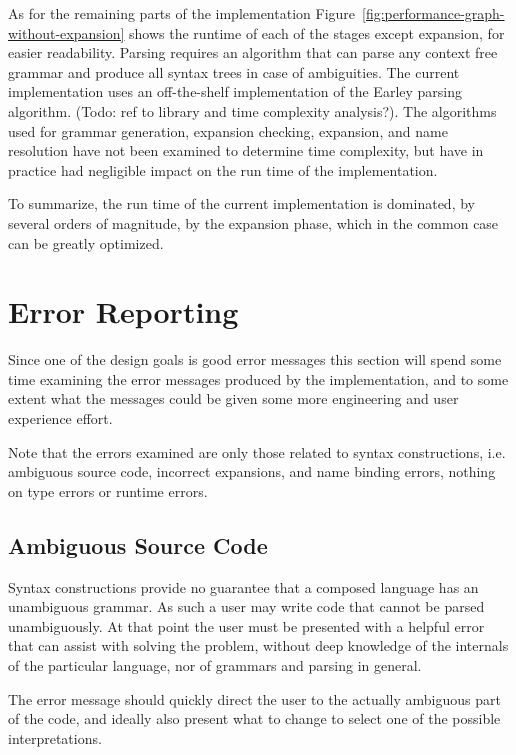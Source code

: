\documentclass{kththesis}
\begin{document}
As for the remaining parts of the implementation Figure~\ref{fig:performance-graph-without-expansion} shows the runtime of each of the stages except expansion, for easier readability. Parsing requires an algorithm that can parse any context free grammar and produce all syntax trees in case of ambiguities. The current implementation uses an off-the-shelf implementation of the Earley parsing algorithm. (Todo: ref to library and time complexity analysis?). The algorithms used for grammar generation, expansion checking, expansion, and name resolution have not been examined to determine time complexity, but have in practice had negligible impact on the run time of the implementation.

To summarize, the run time of the current implementation is dominated, by several orders of magnitude, by the expansion phase, which in the common case can be greatly optimized.

\section{Error Reporting} \label{sec:error-reporting}

Since one of the design goals is good error messages this section will spend some time examining the error messages produced by the implementation, and to some extent what the messages could be given some more engineering and user experience effort.

Note that the errors examined are only those related to syntax constructions, i.e. ambiguous source code, incorrect expansions, and name binding errors, nothing on type errors or runtime errors.

\subsection{Ambiguous Source Code} \label{sec:errors-ambiguous}

Syntax constructions provide no guarantee that a composed language has an unambiguous grammar. As such a user may write code that cannot be parsed unambiguously. At that point the user must be presented with a helpful error that can assist with solving the problem, without deep knowledge of the internals of the particular language, nor of grammars and parsing in general.

The error message should quickly direct the user to the actually ambiguous part of the code, and ideally also present what to change to select one of the possible interpretations.
\end{document}

